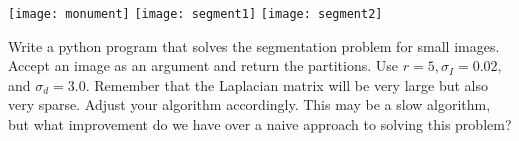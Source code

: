 \documentclass{newsiambook}
\begin{document}
\begin{center}
\texttt{[image: monument]}
\texttt{[image: segment1]}
\texttt{[image: segment2]}
\end{center}

\begin{problem}  Write a python program that solves the segmentation problem for small images.  Accept an image as an argument and return the partitions. Use $r = 5, \sigma_I = 0.02,$ and $\sigma_d = 3.0$. Remember that the Laplacian matrix will be very large but also very sparse.  Adjust your algorithm accordingly.  This may be a slow algorithm, but what improvement do we have over a naive approach to solving this problem?
\end{problem}
\end{document}
